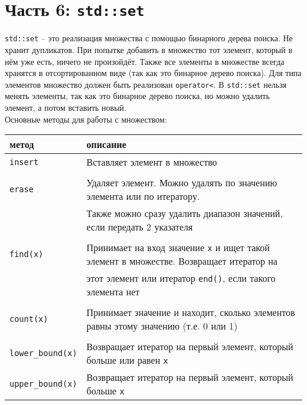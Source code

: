 \documentclass{article}
\begin{document}
\newpage
\section*{Часть 6: \texttt{std::set}}
\texttt{std::set} -- это реализация множества с помощью бинарного дерева поиска. Не хранит дупликатов. При попытке добавить в множество тот элемент, который в нём уже есть, ничего не произойдёт. Также все элементы в множестве всегда хранятся в отсортированном виде (так как это бинарное дерево поиска). Для типа элементов множество должен быть реализован \texttt{operator<}. В \texttt{std::set} нельзя менять элементы, так как это бинарное дерево поиска, но можно удалить элемент, а потом вставить новый.\\

Основные методы для работы с множеством:
\begin{center}
\begin{tabular}{ l | l }
 метод & описание \\ \hline
 \texttt{insert}  & Вставляет элемент в множество\\ \\\hline
 \texttt{erase}   & Удаляет элемент. Можно удалять по значению элемента или по итератору.  \\ 
                  & Также можно сразу удалить диапазон значений, если передать 2 указателя \\\\ \hline
 \texttt{find(x)} & Принимает на вход значение \texttt{x} и ищет такой элемент в множестве. Возвращает итератор на \\
                  &  этот элемент или итератор \texttt{end()}, если такого элемента нет\\ \\ \hline
 \texttt{count(x)}  & Принимает значение и находит, сколько элементов равны этому значению (т.е. 0 или 1) \\ \\\hline
 \texttt{lower\_bound(x)}  & Возвращает итератор на первый элемент, который больше или равен \texttt{x} \\
 \texttt{upper\_bound(x)}  & Возвращает итератор на первый элемент, который больше \texttt{x} \\
\end{tabular}
\end{center}
\end{document}
